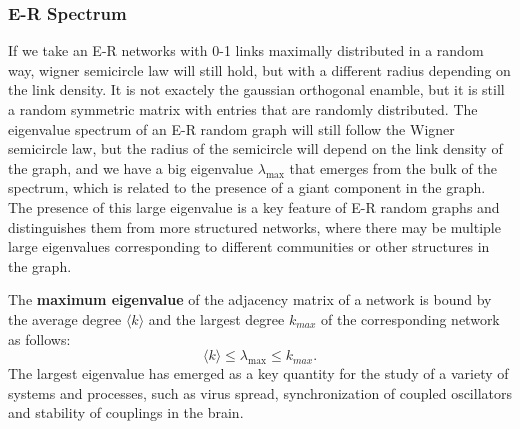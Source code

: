 \subsubsection{E-R Spectrum}

If we take an E-R networks with 0-1 links maximally distributed in a random way, wigner semicircle law will still hold, but with a different radius depending on the link density. It is not exactely the gaussian orthogonal enamble, but it is still a random symmetric matrix with entries that are randomly distributed. The eigenvalue spectrum of an E-R random graph will still follow the Wigner semicircle law, but the radius of the semicircle will depend on the link density of the graph, and we have a big eigenvalue \(\lambda_{\max}\) that emerges from the bulk of the spectrum, which is related to the presence of a giant component in the graph. The presence of this large eigenvalue is a key feature of E-R random graphs and distinguishes them from more structured networks, where there may be multiple large eigenvalues corresponding to different communities or other structures in the graph.

The \textbf{maximum eigenvalue} of the adjacency matrix of a network is bound by the average degree \(\langle k \rangle\) and the largest degree \(k_{max}\) of the corresponding network as follows:
\[
    \langle k \rangle \leq \lambda_{\max} \leq k_{max}.
\]
The largest eigenvalue has emerged as a key quantity for the study of a variety of systems and processes, such as virus spread, synchronization of coupled oscillators and stability of couplings in the brain.
